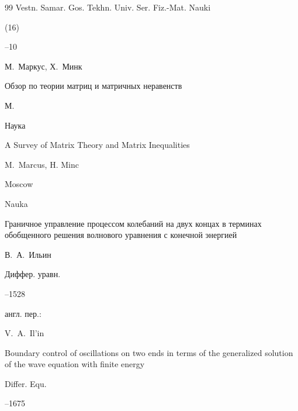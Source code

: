 \begin{thebibliography}{99}
\jour Vestn. Samar. Gos. Tekhn. Univ. Ser. Fiz.-Mat. Nauki


(16)

--10






\by М.~Маркус, Х.~Минк

\book  Обзор по теории матриц и матричных неравенств

\publaddr М.

\publ Наука



\misctransl

\book A Survey of Matrix Theory and Matrix Inequalities 

\by M.~Marcus, H. Minc 

\publaddr Moscow

\publ Nauka












\paper Граничное управление процессом колебаний на двух концах в терминах обобщенного решения волнового уравнения с конечной энергией

\by В.~А.~Ильин

\jour Диффер. уравн.




--1528

\transl англ. пер.:~

\by V.~A.~Il'in

\paper Boundary control of oscillations on two ends in terms of the generalized solution of the wave equation with finite energy

\jour Differ. Equ. 




–1675 





\end{thebibliography}
